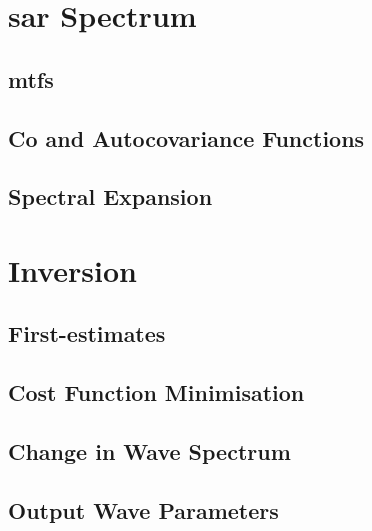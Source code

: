 \section{\acs{sar} Spectrum} \label{sec:systemDesign.sarSpectrum}

\subsection{\acfp{mtf}} \label{subsec:systemDesign.sarSpectrum.mtfs}

\subsection{Co and Autocovariance Functions} \label{subsec:systemDesign.sarSpectrum.coAutoFunc}

\subsection{Spectral Expansion} \label{subsec:systemDesign.sarSpectrum.spectralExpan}



\section{Inversion} \label{sec:systemDesign.inversion}

\subsection{First-estimates} \label{subsec:systemDesign.inversion.firstEstimates}

\subsection{Cost Function Minimisation} \label{subsec:systemDesign.inversion.costFuncMinimise}


\subsection{Change in Wave Spectrum} \label{subsec:systemDesign.inversion.changeWaveSpectrum}


\subsection{Output Wave Parameters} \label{subsec:systemDesign.inversion.outputWaveParams}



